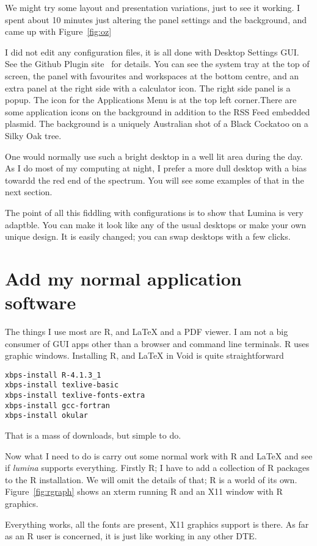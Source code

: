\documentclass{article}  %
\begin{document}
{We might try some layout and presentation variations, just to see it working.  I spent about 10 minutes just altering the panel settings and the background, and came up with Figure~\ref{fig:oz}

I did not edit any configuration files, it is all done with Desktop Settings GUI. See the Github Plugin site~\cite{plug:22} for details.
You can see the system tray at the top of screen, the panel with favourites and workspaces at the bottom centre, and an extra panel at the right side with a calculator icon. The right side panel is a popup. The icon for the Applications Menu is at the top left corner.There are some application icons on the background in addition to the RSS Feed embedded plasmid. The background is a uniquely Australian shot of a Black Cockatoo on a Silky Oak tree. 

One would normally use such a bright desktop in a well lit area during the day. As I do most of my computing at night, I prefer a more dull desktop with a bias towardd the red end of the spectrum. You will see some examples of that in the next section.

The point of all this fiddling with configurations is to show that Lumina is very adaptble. You can make it look like any of the usual desktops or make your own unique design. It is easily changed; you can swap desktops with a few clicks.


\clearpage
\section{Add my normal application software}
The things I use most are R, and \LaTeX \hspace{.1cm} and a PDF viewer. I am not a big consumer of GUI apps other than a browser and command line terminals. R uses graphic windows. 
Installing R, and \LaTeX \hspace{.1cm} in Void is quite straightforward
\begin{verbatim}
xbps-install R-4.1.3_1
xbps-install texlive-basic
xbps-install texlive-fonts-extra
xbps-install gcc-fortran
xbps-install okular
\end{verbatim}
That is a mass of downloads, but simple to do. 

Now what I need to do is carry out some normal work with R and \LaTeX \hspace{.1cm} and see if {\em lumina} supports everything. Firstly R; I have to add a collection of R packages to the R installation. We will omit the details of that; R is a world of its own. Figure~\ref{fig:rgraph} shows an xterm running R and an X11 window with R graphics. 

Everything works, all the fonts are present, X11 graphics support is there. As far as an R user is concerned, it is just like working in any other DTE.

}
\end{document}
